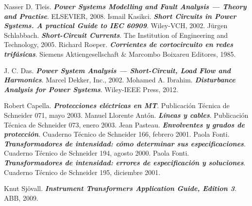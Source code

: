 \begin{thebibliography}{99}
     Nasser D. Tleis. \textbf{\textit{Power Systems Modelling and Fault Analysis --- Theory and Practise}}.  ELSEVIER, 2008.
     Ismail Kasikci. \textbf{\textit{Short Circuits in Power Systems. A practical Guide to IEC 60909}}.  Wiley-VCH, 2002.
     Jürgen Schlabbach. \textbf{\textit{Short-Circuit Currents}}.  The Institution of Engineering and Technology, 2005.
     Richard Roeper. \textbf{\textit{Corrientes de cortocircuito en redes trifásicas}}.  Siemens Aktiengesellschaft \& Marcombo Boixareu Editores, 1985.

     J. C. Das. \textbf{\textit{Power System Analysis --- Short-Circuit, Load Flow and Harmonics}}. Marcel Dekker, Inc., 2002.
     Mohamed A. Ibrahim. \textbf{\textit{Disturbance Analysis for Power Systems}}. Wiley-IEEE Press, 2012.

     Robert Capella. \textbf{\textit{Protecciones eléctricas en MT}}.  Publicación Técnica de Schneider 071, mayo 2003.
     Manuel Llorente Antón. \textbf{\textit{Líneas y cables}}.  Publicación Técnica de Schneider 073, enero 2003.
     Jean Pasteau. \textbf{\textit{Envolventes y grados de protección}}.  Cuaderno Técnico de Schneider 166, febrero 2001.
     Paola Fonti. \textbf{\textit{Transformadores de intensidad: cómo determinar sus especificaciones}}.  Cuaderno Técnico de Schneider 194, agosto 2000.
     Paola Fonti. \textbf{\textit{Transformadores de intensidad: errores de especificación y soluciones}}.  Cuaderno Técnico de Schneider 195, diciembre 2001.

     Knut Sjövall. \textbf{\textit{Instrument Transformers Application Guide, Edition 3}}.  ABB, 2009.

\end{thebibliography}
